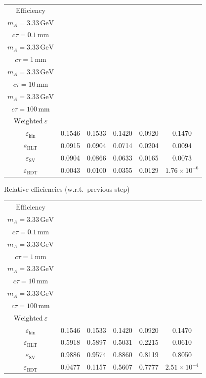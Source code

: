 \documentclass[10pt,a4paper]{article}
\begin{document}
{\begin{tabular}{cccccc}
\toprule
$\mathrm{Efficiency}$ & \shortstack{$m_{\pi}=10\,\mathrm{GeV}$\\$m_{A}=3.33\,\mathrm{GeV}$\\$c\tau=0.1\,\mathrm{mm}$} & \shortstack{$m_{\pi}=10\,\mathrm{GeV}$\\$m_{A}=3.33\,\mathrm{GeV}$\\$c\tau=1\,\mathrm{mm}$} & \shortstack{$m_{\pi}=10\,\mathrm{GeV}$\\$m_{A}=3.33\,\mathrm{GeV}$\\$c\tau=10\,\mathrm{mm}$} & \shortstack{$m_{\pi}=10\,\mathrm{GeV}$\\$m_{A}=3.33\,\mathrm{GeV}$\\$c\tau=100\,\mathrm{mm}$} & \shortstack{$\mathrm{QCD}$\\$\mathrm{Weighted}\ \varepsilon$} \\
\midrule
$\varepsilon_{\mathrm{kin}}$ & 0.1546 & 0.1533 & 0.1420 & 0.0920 & 0.1470\\
$\varepsilon_{\mathrm{HLT}}$ & 0.0915 & 0.0904 & 0.0714 & 0.0204 & 0.0094\\
$\varepsilon_{\mathrm{SV}}$ & 0.0904 & 0.0866 & 0.0633 & 0.0165 & 0.0073\\
$\varepsilon_{\mathrm{BDT}}$ & 0.0043 & 0.0100 & 0.0355 & 0.0129 & $1.76\times10^{-6}$\\
\bottomrule
\end{tabular}

\vspace{18pt}

Relative efficiencies (w.r.t.\ previous step)

\begin{tabular}{cccccc}
\toprule
$\mathrm{Efficiency}$ & \shortstack{$m_{\pi}=10\,\mathrm{GeV}$\\$m_{A}=3.33\,\mathrm{GeV}$\\$c\tau=0.1\,\mathrm{mm}$} & \shortstack{$m_{\pi}=10\,\mathrm{GeV}$\\$m_{A}=3.33\,\mathrm{GeV}$\\$c\tau=1\,\mathrm{mm}$} & \shortstack{$m_{\pi}=10\,\mathrm{GeV}$\\$m_{A}=3.33\,\mathrm{GeV}$\\$c\tau=10\,\mathrm{mm}$} & \shortstack{$m_{\pi}=10\,\mathrm{GeV}$\\$m_{A}=3.33\,\mathrm{GeV}$\\$c\tau=100\,\mathrm{mm}$} & \shortstack{$\mathrm{QCD}$\\$\mathrm{Weighted}\ \varepsilon$} \\
\midrule
$\varepsilon_{\mathrm{kin}}$ & 0.1546 & 0.1533 & 0.1420 & 0.0920 & 0.1470\\
$\varepsilon_{\mathrm{HLT}}$ & 0.5918 & 0.5897 & 0.5031 & 0.2215 & 0.0610\\
$\varepsilon_{\mathrm{SV}}$ & 0.9886 & 0.9574 & 0.8860 & 0.8119 & 0.8050\\
$\varepsilon_{\mathrm{BDT}}$ & 0.0477 & 0.1157 & 0.5607 & 0.7777 & $2.51\times10^{-4}$\\
\bottomrule
\end{tabular}

}
\end{document}
